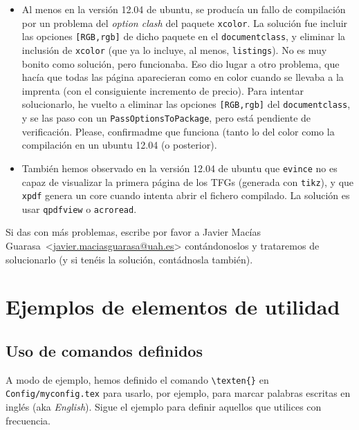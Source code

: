 \documentclass[spanish,openright]{book}
\makeatletter
\newcommand{\myAuthorName}{Javier}
\newcommand{\myAuthorSurname}{Macías Guarasa}
\newcommand{\myAuthorFullName}{\myAuthorName{} \myAuthorSurname{}}
\newcommand{\myAuthorEmail}{javier.maciasguarasa@uah.es}
\DeclareRobustCommand{\texten}[1]{\textit{#1}}
\newcommand{\contactauthor}{\myAuthorFullName~\textless\href{mailto:\myAuthorEmail}{\myAuthorEmail}\textgreater}
\makeatother
\begin{document}
\begin{itemize}

\item Al menos en la versión 12.04 de ubuntu, se producía un fallo de
  compilación por un problema del \textit{option clash} del paquete
  \texttt{xcolor}. La solución fue incluir las opciones
  \texttt{[RGB,rgb]} de dicho paquete en el \texttt{documentclass}, y
  eliminar la inclusión de \texttt{xcolor} (que ya lo incluye, al menos,
  \texttt{listings}). No es muy bonito como solución, pero
  funcionaba. Eso dio lugar a otro problema, que hacía que todas las
  página aparecieran como en color cuando se llevaba a la imprenta (con
  el consiguiente incremento de precio). Para intentar solucionarlo, he
  vuelto a eliminar las opciones \texttt{[RGB,rgb]} del
  \texttt{documentclass}, y se las paso con un
  \texttt{PassOptionsToPackage}, pero está pendiente de
  verificación. Please, confirmadme que funciona (tanto lo del color
  como la compilación en un ubuntu 12.04 (o posterior).

\item También hemos observado en la versión 12.04 de ubuntu que
  \texttt{evince} no es capaz de visualizar la primera página de los
  TFGs (generada con \texttt{tikz}), y que \texttt{xpdf} genera un core
  cuando intenta abrir el fichero compilado. La solución es usar
  \texttt{qpdfview} o \texttt{acroread}. 

\end{itemize}

Si das con más problemas, escribe por favor a \contactauthor
contándonoslos y trataremos de solucionarlo (y si tenéis la solución,
contádnosla también).


\section{Ejemplos de elementos de utilidad}
\label{sec:ejempl-de-elem}

\subsection{Uso de comandos definidos}
\label{sec:uso-de-comandos}

A modo de ejemplo, hemos definido el comando
\texttt{\textbackslash{}texten\{\}} en \texttt{Config/myconfig.tex} para
usarlo, por ejemplo, para marcar palabras escritas en inglés (aka
\texten{English}). Sigue el ejemplo para definir aquellos que utilices
con frecuencia.
\end{document}
